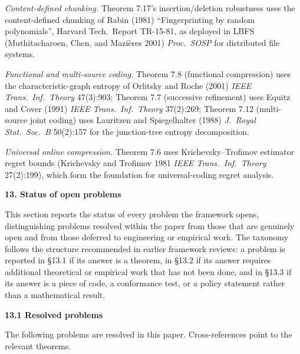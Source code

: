 \documentclass[
]{article}
\begin{document}
\emph{Content-defined chunking.} Theorem 7.17's insertion/deletion
robustness uses the content-defined chunking of Rabin (1981)
``Fingerprinting by random polynomials'', Harvard Tech.\ Report
TR-15-81, as deployed in LBFS (Muthitacharoen, Chen, and Mazi\`eres
2001) \emph{Proc.\ SOSP} for distributed file systems.

\emph{Functional and multi-source coding.} Theorem 7.8 (functional
compression) uses the characteristic-graph entropy of Orlitsky and
Roche (2001) \emph{IEEE Trans.\ Inf.\ Theory} 47(3):903; Theorem 7.7
(successive refinement) uses Equitz and Cover (1991) \emph{IEEE
Trans.\ Inf.\ Theory} 37(2):269; Theorem 7.12 (multi-source joint
coding) uses Lauritzen and Spiegelhalter (1988) \emph{J.\ Royal
Stat.\ Soc.\ B} 50(2):157 for the junction-tree entropy
decomposition.

\emph{Universal online compression.} Theorem 7.6 uses
Krichevsky--Trofimov estimator regret bounds (Krichevsky and
Trofimov 1981 \emph{IEEE Trans.\ Inf.\ Theory} 27(2):199), which
form the foundation for universal-coding regret analysis.

\textbf{13. Status of open problems}

This section reports the status of every problem the framework opens,
distinguishing problems resolved within the paper from those that are
genuinely open and from those deferred to engineering or empirical work.
The taxonomy follows the structure recommended in earlier framework
reviews: a problem is reported in §13.1 if its answer is a theorem, in
§13.2 if its answer requires additional theoretical or empirical work
that has not been done, and in §13.3 if its answer is a piece of code, a
conformance test, or a policy statement rather than a mathematical
result.

\textbf{13.1 Resolved problems}

The following problems are resolved in this paper. Cross-references
point to the relevant theorems.
\end{document}

